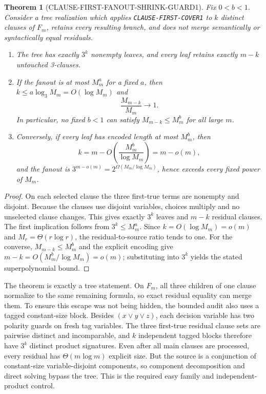 \documentclass[11pt]{article}
\newtheorem{theorem}{Theorem}
\begin{document}
\begin{theorem}[CLAUSE-FIRST-FANOUT-SHRINK-GUARD1]
Fix $0<b<1$.  Consider a tree realization which applies
\texttt{CLAUSE-FIRST-COVER1} to $k$ distinct clauses of $F_m$, retains every
resulting branch, and does not merge semantically or syntactically equal
residuals.

\begin{enumerate}
\item The tree has exactly $3^k$ nonempty leaves, and every leaf retains
exactly $m-k$ untouched 3-clauses.
\item If the fanout is at most $M_m^a$ for a fixed $a$, then
$k\le a\log_3 M_m=O(\log M_m)$ and
\[
 \frac{M_{m-k}}{M_m}\longrightarrow1.
\]
In particular, no fixed $b<1$ can satisfy $M_{m-k}\le M_m^b$ for all large
$m$.
\item Conversely, if every leaf has encoded length at most $M_m^b$, then
\[
 k=m-O\!\left(\frac{M_m^b}{\log M_m}\right)=m-o(m),
\]
and the fanout is $3^{m-o(m)}=2^{\Omega(M_m/\log M_m)}$, hence exceeds every
fixed power of $M_m$.
\end{enumerate}
\end{theorem}

\begin{proof}
On each selected clause the three first-true terms are nonempty and disjoint.
Because the clauses use disjoint variables, choices multiply and no unselected
clause changes.  This gives exactly $3^k$ leaves and $m-k$ residual clauses.
The first implication follows from $3^k\le M_m^a$.  Since
$k=O(\log M_m)=o(m)$ and $M_r=\Theta(r\log r)$, the residual-to-source ratio
tends to one.  For the converse, $M_{m-k}\le M_m^b$ and the explicit encoding
give $m-k=O(M_m^b/\log M_m)=o(m)$; substituting into $3^k$ yields the stated
superpolynomial bound.
\end{proof}

The theorem is exactly a tree statement.  On $F_m$, all three children of one
clause normalize to the same remaining formula, so exact residual equality
can merge them.  To ensure this escape was not being hidden, the bounded audit
also uses a tagged constant-size block.  Besides
$(x\vee y\vee z)$, each decision variable has two polarity guards on fresh
tag variables.  The three first-true residual clause sets are pairwise
distinct and incomparable, and $k$ independent tagged blocks therefore have
$3^k$ distinct product signatures.  Even after all main clauses are processed,
every residual has $\Theta(m\log m)$ explicit size.  But the source is a
conjunction of constant-size variable-disjoint components, so component
decomposition and direct solving bypass the tree.  This is the required easy
family and independent-product control.
\end{document}
